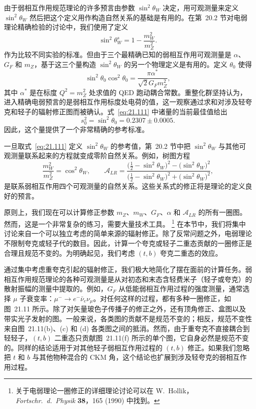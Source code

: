 由于弱相互作用规范理论的许多预言由参数 $\sin^2\theta_W$ 决定，用可观测量来定义 $\sin^2\theta_W$ 然后把这个定义用作构造自然关系的基础是有用的。在第~20.2 节对电弱理论精确检验的讨论中，我们使用了定义
\begin{equation}
  \sin^2\theta^s_W = 1 - \frac{m_W^2}{m_Z^2} .
  \label{eq:21.110}
\end{equation}
作为比较不同实验的标准。但由于三个最精确已知的弱相互作用可观测量是 $\alpha$、$G_F$ 和 $m_Z$，基于这三个量构造 $\sin^2\theta_W$ 的另一个物理定义是有用的。定义 $\theta_0$ 使得
\begin{equation}
  \sin^2\theta_0\cos^2\theta_0 = \frac{\pi\alpha^{*}}{\sqrt{2}G_Fm_Z^2} ,
  \label{eq:21.111}
\end{equation}
其中 $\alpha^{*}$ 是在标度 $Q^2 = m_Z^2$ 处求值的 QED 跑动耦合常数。重整化群坚持认为，进入精确电弱预言的是弱相互作用标度处电荷的值，这一观察通过求和对涉及轻夸克和轻子的辐射修正图而被确认。式~\eqref{eq:21.111} 中诸量的当前最佳值给出
\begin{equation}
  s^2_0 = \sin^2\theta_0 = 0.2307 \pm 0.0005 .
  \label{eq:21.112}
\end{equation}
因此，这个量提供了一个非常精确的参考标准。

一旦取式~\eqref{eq:21.111} 定义 $\sin^2\theta_W$ 的参考值，第~20.2 节中把 $\sin^2\theta_W$ 与其他可观测量联系起来的方程就变成零阶自然关系。例如，树图方程
\begin{equation}
  \frac{m_W^2}{m_Z^2} = \cos^2\theta_W,\qquad
  \mathcal{A}_{LR} = \frac{\bigl( \tfrac{1}{2} - \sin^2\theta_W \bigr)^2
    - \bigl( \sin^2\theta_W \bigr)^2}
    {\bigl( \tfrac{1}{2} - \sin^2\theta_W \bigr)^2
    + \bigl( \sin^2\theta_W \bigr)^2} ,
  \label{eq:21.113}
\end{equation}
是联系弱相互作用四个可观测量的自然关系。这些关系式的修正将是理论的定义良好的预言。

原则上，我们现在可以计算修正参数 $m_Z$、$m_W$、$G_F$、$\alpha$ 和 $\mathcal{A}_{LR}$ 的所有一圈图。然而，这是一个非常复杂的练习，需要大量技术工具。%
\footnote{关于电弱理论一圈修正的详细理论讨论可以在 W.~Hollik，\emph{Fortschr.\ d.\ Physik} \textbf{38}，165 (1990) 中找到。} 在本节中，我们将集中讨论来自一个可以独立考虑的简单来源的辐射修正。除了反常问题之外，电弱理论不限制夸克或轻子代的数目。因此，计算一个夸克或轻子二重态贡献的一圈修正是合理且规范不变的。为明确起见，我们考虑 $(t, b)$ 夸克二重态的效应。

通过集中考虑重夸克引起的辐射修正，我们极大地简化了摆在面前的计算任务。弱相互作用规范理论的各种可观测量是从对初态和末态含轻费米子（轻子或夸克）的散射振幅的测量中提取的。例如，$G_F$ 从低能弱相互作用过程的强度测量，通常选择 $\mu$ 子衰变率：$\mu^{-}\to e^{-}\bar{\nu}_e\nu_\mu$。对任何这样的过程，都有多种一圈修正，如图~21.11 所示。除了对矢量玻色子传播子的修正之外，还有顶角修正、盒图以及带实光子发射的图。一般来说，各类图的贡献不是规范不变的；相反，规范不变性来自图~21.11(b)、(c) 和 (d) 各类图之间的抵消。然而，由于重夸克不直接耦合到轻轻子，$(t, b)$ 二重态只贡献图~21.11(f) 所示的单个图，它自身必然是规范不变的。同样的结论适用于对其他轻子弱相互作用过程的 $(t, b)$ 修正。如果我们忽略把 $t$ 和 $b$ 与其他物种混合的 CKM 角，这个结论也扩展到涉及轻夸克的弱相互作用过程。

